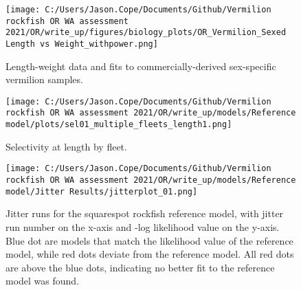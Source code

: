 \documentclass[11pt,
  english,
  a4paper,
]{article}
\begin{document}
\tagmcend\tagstructend


\begin{figure}
\centering
\texttt{[image: C:/Users/Jason.Cope/Documents/Github/Vermilion rockfish OR WA assessment 2021/OR/write\_up/figures/biology\_plots/OR\_Vermilion\_Sexed Length vs Weight\_withpower.png]}
\caption{Length-weight data and fits to commercially-derived sex-specific vermilion samples.\label{fig:len-weight-fit}}
\end{figure}

\tagmcend\tagstructend


\begin{figure}
\centering
\texttt{[image: C:/Users/Jason.Cope/Documents/Github/Vermilion rockfish OR WA assessment 2021/OR/write\_up/models/Reference model/plots/sel01\_multiple\_fleets\_length1.png]}
\caption{Selectivity at length by fleet.\label{fig:selex}}
\end{figure}

\tagmcend\tagstructend


\begin{figure}
\centering
\texttt{[image: C:/Users/Jason.Cope/Documents/Github/Vermilion rockfish OR WA assessment 2021/OR/write\_up/models/Reference model/Jitter Results/jitterplot\_01.png]}
\caption{Jitter runs for the squarespot rockfish reference model, with jitter run number on the x-axis and -log likelihood value on the y-axis. Blue dot are models that match the likelihood value of the reference model, while red dots deviate from the reference model. All red dots are above the blue dots, indicating no better fit to the reference model was found.\label{fig:jitter_01}}
\end{figure}
\end{document}
